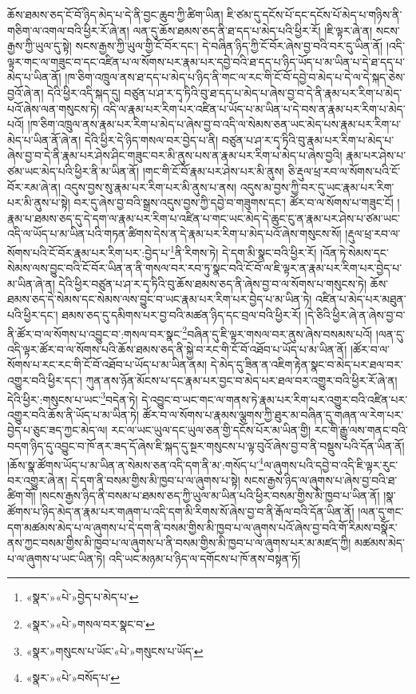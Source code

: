 ཆོས་ཐམས་ཅད་ངོ་བོ་ཉིད་མེད་པ་དེ་ནི་བྱང་ཆུབ་ཀྱི་ཚིག་ཡིན། ཇི་ཙམ་དུ་དངོས་པོ་དང་དངོས་པོ་མེད་པ་གཉིས་ནི་གཅིག་ལ་འགལ་བའི་ཕྱིར་རོ་ཞེ་ན། ལན་དུ་ཆོས་ཐམས་ཅད་ནི་ཐ་དད་པ་མེད་པའི་ཕྱིར་རོ། །ཇི་ལྟར་ཞེ་ན། སངས་རྒྱས་ཀྱི་ཡུལ་དུ་སྟེ། སངས་རྒྱས་ཀྱི་ཡུལ་གྱི་ངོ་བོར་དང་། དེ་བཞིན་ཉིད་ཀྱི་ངོ་བོར་ཞེས་བྱ་བའི་བར་དུ་ཡིན་ནོ། །འདི་ལྟར་གང་ལ་གཟུང་བ་དང་འཛིན་པ་ལ་སོགས་པར་རྣམ་པར་དབྱེ་བའི་ཐ་དད་པ་ཉིད་ཡོད་པ་མ་ཡིན་པ་དེ་ཐ་དད་པ་མེད་པ་ཡིན་ནོ། །ཁ་ཅིག་འཁྲུལ་ནས་ཐ་དད་པ་མེད་པ་ཉིད་ནི་གང་ལ་རང་གི་ངོ་བོ་དབྱེ་བ་མེད་པ་དེ་ལ་དེ་སྐད་ཅེས་བྱའོ་ཞེ་ན། དེའི་ཕྱིར་འདི་སྐད་དུ། བཙུན་པ་ཤ་ར་དྭ་ཏིའི་བུ་ཐ་དད་པ་མེད་པ་ཞེས་བྱ་བ་དེ་ནི་རྣམ་པར་རིག་པ་མེད་པའོ་ཞེས་ལན་གསུངས་ཏེ། འདི་ལ་རྣམ་པར་རིག་པར་འཛིན་པ་ཡོད་པ་མ་ཡིན་པ་དེ་བས་ན་རྣམ་པར་རིག་པ་མེད་པའོ། །ཁ་ཅིག་འཁྲུལ་ནས་རྣམ་པར་རིག་པ་མེད་པ་ཞེས་བྱ་བ་འདི་ལ་སེམས་ཅན་ཡང་མེད་པས་རྣམ་པར་རིག་པ་མེད་པ་ཡིན་ནོ་ཞེ་ན། དེའི་ཕྱིར་དེ་ཉིད་གསལ་བར་བྱེད་པ་ནི། བཙུན་པ་ཤ་ར་དྭ་ཏིའི་བུ་རྣམ་པར་རིག་པ་མེད་པ་ཞེས་བྱ་བ་དེ་ནི་རྣམ་པར་ཤེས་ཤིང་གཟུང་བར་མི་ནུས་པས་ན་རྣམ་པར་རིག་པ་མེད་པ་ཞེས་བྱའི། རྣམ་པར་ཤེས་པ་ཙམ་ཡང་མེད་པའི་ཕྱིར་ནི་མ་ཡིན་ནོ། །གང་གི་ངོ་བོ་རྣམ་པར་ཤེས་པར་མི་ནུས། ཅི་རྡུལ་ཕྲ་རབ་ལ་སོགས་པའི་ངོ་བོར་རམ་ཞེ་ན། འདུས་བྱས་སུ་རྣམ་པར་རིག་པར་མི་ནུས་པ་ནས། འདུས་མ་བྱས་ཀྱི་བར་དུ་ཡང་རྣམ་པར་རིག་པར་མི་ནུས་པ་སྟེ། བར་དུ་ཞེས་བྱ་བའི་སྒྲས་འདུས་བྱས་ཀྱི་དབྱེ་བ་གཟུགས་དང་། ཚོར་བ་ལ་སོགས་པ་གཟུང་ངོ། །རྣམ་པ་ཐམས་ཅད་དུ་དེ་དག་ལ་རྣམ་པར་རིག་པ་འཛིན་པ་གང་ཡང་མེད་དེ་ཆུང་ངུ་ན་རྣམ་པར་ཤེས་པ་ཙམ་ཡང་འདི་ལ་ཡོད་པ་མ་ཡིན་པའི་གཏན་ཚིགས་དེས་ན་དེ་རྣམ་པར་རིག་པ་མེད་པའོ་ཞེས་གསུངས་སོ། །རྡུལ་ཕྲ་རབ་ལ་སོགས་པའི་ངོ་བོར་རྣམ་པར་རིག་པར་:བྱེད་པ་\footnote{«སྣར་»«པེ་»བྱེད་པ་མེད་པ་}ནི་རིགས་ཏེ། དེ་དག་མི་སྣང་བའི་ཕྱིར་རོ། །འོན་ཏེ་སེམས་དང་སེམས་ལས་བྱུང་བའི་ངོ་བོར་ཡིན་ན་ནི་གསལ་བར་རབ་ཏུ་སྣང་བའི་ངོ་བོ་ལ་ཇི་ལྟར་ན་རྣམ་པར་རིག་པར་བྱེད་པ་མ་ཡིན་ཞེ་ན། དེའི་ཕྱིར་བཙུན་པ་ཤ་ར་དྭ་ཏིའི་བུ་ཆོས་ཐམས་ཅད་ནི་ཞེས་བྱ་བ་ལ་སོགས་པ་གསུངས་ཏེ། ཆོས་ཐམས་ཅད་དེ་སེམས་དང་སེམས་ལས་བྱུང་བ་ཡང་རྣམ་པར་རིག་པར་བྱེད་པ་མ་ཡིན་ཏེ། འཛིན་པ་མེད་པར་མཐུན་པའི་ཕྱིར་དང་། ཐམས་ཅད་དུ་དམིགས་པར་བྱ་བའི་མཚན་ཉིད་དང་བྲལ་བའི་ཕྱིར་རོ། །དེ་ཅིའི་ཕྱིར་ཞེ་ན་ཞེས་བྱ་བ་ནི་ཚོར་བ་ལ་སོགས་པ་འབྱུང་བ་:གསལ་བར་སྣང་\footnote{«སྣར་»«པེ་»གསལ་བར་སྣང་བ་}བཞིན་དུ་ཇི་ལྟར་གསལ་བར་ནུས་ཞེས་བསམས་པའོ། །ལན་དུ་འདི་ལྟར་ཚོར་བ་ལ་སོགས་པའི་ཆོས་ཐམས་ཅད་ནི་སྐྱེ་བ་རང་གི་ངོ་བོ་འཐོབ་པ་ཡོད་པ་མ་ཡིན་ནོ། །ཚོར་བ་ལ་སོགས་པ་རང་རང་གི་ངོ་བོ་འཐོབ་པ་ཡོད་པ་མ་ཡིན་ནམ། དེ་མེད་དུ་ཟིན་ན་འཇིག་རྟེན་སྣང་བ་མེད་པར་ཐལ་བར་འགྱུར་བའི་ཕྱིར་དང་། ཀུན་ནས་ཉོན་མོངས་པ་དང་རྣམ་པར་བྱང་བ་མེད་པར་ཐལ་བར་འགྱུར་བའི་ཕྱིར་རོ་ཞེ་ན། དེའི་ཕྱིར་:གསུངས་པ་ཡང་\footnote{«སྣར་»གསུངས་པ་ཡོང་«པེ་»གསུངས་པ་ཡོད་}བདེན་ཏེ། དེ་འབྱུང་བ་ཡང་གང་ལ་གནས་ཏེ་རྣམ་པར་རིག་པར་འགྱུར་བའི་འཛིན་པར་འགྱུར་བའི་ཆོས་ནི་ཡོད་པ་མ་ཡིན་ཏེ། ཚོར་བ་ལ་སོགས་པ་རྣམས་ལྕགས་ཀྱི་ཐུར་མ་བཞིན་དུ་གཞན་ལ་རེག་པར་བྱེད་པ་ཅུང་ཟད་ཀྱང་མེད་ལ། རང་ལ་ཡང་ཡུལ་དང་ཡུལ་ཅན་གྱི་དངོས་པོར་མ་ཡིན་གྱི། རང་གི་རྒྱུ་ལས་གནང་བའི་བདག་ཉིད་དུ་འབྱུང་བ་ཁོ་ནར་ཟད་དོ་ཞེས་ཇི་སྐད་དུ་སྔར་གསུངས་པ་ལྟ་བུའོ་ཞེས་བྱ་བ་ནི་བསྡུས་པའི་དོན་ཡིན་ནོ། །ཆོས་སྣ་ཚོགས་ཡོད་པ་མ་ཡིན་ན་སེམས་ཅན་འདི་དག་ནི་མ་:གསོད་པ་\footnote{«སྣར་»«པེ་»བསོད་པ་}ལ་ཞུགས་པའི་དབྱེ་བ་འདི་ཇི་ལྟར་རུང་བར་འགྱུར་ཞེ་ན། དེ་དག་ནི་བསམ་གྱིས་མི་ཁྱབ་པ་ལ་ཞུགས་པ་སྟེ། སངས་རྒྱས་ཉིད་ལ་ཞུགས་པ་ཞེས་བྱ་བའི་ཐ་ཚིག་གོ། །སངས་རྒྱས་ཉིད་ནི་བསམ་པ་ཐམས་ཅད་ཀྱི་ཡུལ་མ་ཡིན་པའི་ཕྱིར་བསམ་གྱིས་མི་ཁྱབ་པ་ཡིན་ནོ། །སྣ་ཚོགས་པ་ཉིད་མེད་ན་རྣམ་པར་གཞག་པ་འདི་དག་མི་རིགས་སོ་ཞེས་བྱ་བ་ནི་རྒོལ་བའི་དོན་ཡིན་ནོ། །ལན་དུ་གང་དག་མཚམས་མེད་པ་ལ་ཞུགས་པ་དེ་དག་ནི་བསམ་གྱིས་མི་ཁྱབ་པ་ལ་ཞུགས་པའོ་ཞེས་བྱ་བའི་གོ་རིམས་བསྣོར་ནས་ཀྱང་བསམ་གྱིས་མི་ཁྱབ་པ་ལ་ཞུགས་པ་ནི་བསམ་གྱིས་མི་ཁྱབ་པ་ལ་ཞུགས་པར་མ་མཛད་ཀྱི། མཚམས་མེད་པ་ལ་ཞུགས་པ་ཡང་ཡིན་ཏེ། འདི་ཡང་མཉམ་པ་ཉིད་ལ་དགོངས་པ་ཁོ་ནས་བསྟན་ཏོ། 